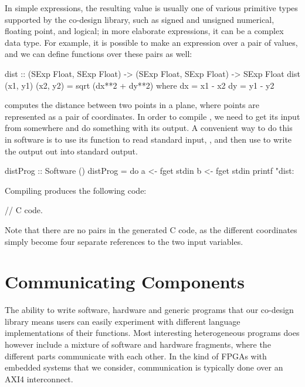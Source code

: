 \documentclass[../main.tex]{subfiles}
\begin{document}
In simple expressions, the resulting value is usually one of various primitive types supported by the co-design library, such as signed and unsigned numerical, floating point, and logical; in more elaborate expressions, it can be a complex data type. For example, it is possible to make an expression over a pair of values, and we can define functions over these pairs as well:

\begin{code}
dist :: (SExp Float, SExp Float) -> (SExp Float, SExp Float) -> SExp Float
dist (x1, y1) (x2, y2) = sqrt (dx**2 + dy**2)
  where
    dx = x1 - x2
    dy = y1 - y2
\end{code}

\noindent {} computes the distance between two points in a plane, where points are represented as a pair of coordinates. In order to compile , we need to get its input from somewhere and do something with its output. A convenient way to do this in software is to use its  function to read standard input, , and then use  to write the output out into standard output.

\begin{code}
distProg :: Software ()
distProg = do
  a <- fget stdin
  b <- fget stdin
  printf "dist: %
\end{code}

Compiling  produces the following code:

\begin{code}
// C code.
\end{code}

\noindent Note that there are no pairs in the generated C code, as the different coordinates simply become four separate references to the two input variables.

\section{Communicating Components}

The ability to write software, hardware and generic programs that our co-design library means users can easily experiment with different language implementations of their functions. Most interesting heterogeneous programs does however include a mixture of software and hardware fragments, where the different parts communicate with each other. In the kind of FPGAs with embedded systems that we consider, communication is typically done over an AXI4 interconnect.
\end{document}
